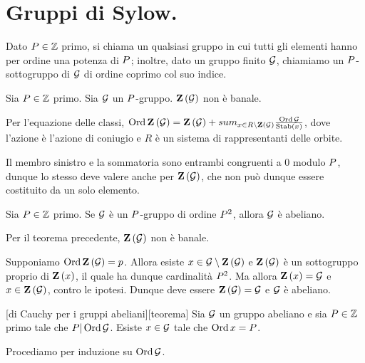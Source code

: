 \section{Gruppi di Sylow.}\label{GruppiDiSylow}
\begin{Definition}
	Dato $P \in \mathbb{Z}$ primo,
	si chiama  un qualsiasi gruppo
	in cui tutti gli elementi hanno per ordine una potenza di $P$;
	inoltre, dato un gruppo finito $\mathcal{G}$,
	chiamiamo 
	un $P$-sottogruppo di $\mathcal{G}$ di ordine
	coprimo col suo indice.
\end{Definition}
\begin{Theorem}
	Sia $P \in \mathbb{Z}$ primo.
	Sia $\mathcal{G}$ un $P$-gruppo.
	$\textbf{Z} \left ( \mathcal{G} \right )$ non \`e banale.
\end{Theorem}
\Proof
Per l'equazione delle classi,
$\GroupOrder{\GroupCenter{\Group}} =
\GroupCenter{\Group} +
sum_{x \in R \SetMin \GroupCenter{\Group}}
\frac{\GroupOrder{\Group}}{\Stabilizer{x}}$,
dove l'azione \`e l'azione di coniugio e
$R$ \`e un sistema di rappresentanti delle orbite.
\par
Il membro sinistro e la sommatoria sono entrambi
congruenti a $0$ modulo $P$, dunque lo stesso
deve valere anche per $\textbf{Z} \left ( \mathcal{G} \right )$, che non
pu\`o dunque essere costituito da un solo elemento.
\EndProof
\begin{Corollary}
	Sia $P \in \mathbb{Z}$ primo.
	Se $\mathcal{G}$ \`e un $P$-gruppo di ordine
	$P^2$, allora $\mathcal{G}$ \`e abeliano.
\end{Corollary}
\Proof
Per il teorema precedente, $\textbf{Z} \left ( \mathcal{G} \right )$
non \`e banale.
\par
Supponiamo $\operatorname{\operatorname{Ord}}{\textbf{Z} \left ( \mathcal{G} \right )} = p$.
Allora esiste $x \in \mathcal{G} \setminus \textbf{Z} \left ( \mathcal{G} \right )$ e
$\textbf{Z} \left ( \mathcal{G} \right )$ \`e un sottogruppo proprio
di $\textbf{Z} \left ( x \right )$, il quale ha dunque cardinalit\`a
$P^2$. Ma allora $\textbf{Z} \left ( x \right ) = \mathcal{G}$ e
$x \in \textbf{Z} \left ( \mathcal{G} \right )$, contro le ipotesi.
Dunque deve essere $\textbf{Z} \left ( \mathcal{G} \right ) = \mathcal{G}$
e $\mathcal{G}$ \`e abeliano.
\EndProof
\begin{Theorem}
[di Cauchy per i gruppi
abeliani][teorema]
	Sia $\mathcal{G}$ un gruppo abeliano e sia
	$P \in \mathbb{Z}$ primo tale che
	$P | \operatorname{\operatorname{Ord}}{\mathcal{G}}$.
	Esiste $x \in \mathcal{G}$ tale che
	$\operatorname{\operatorname{Ord}}{x} = P$.
\end{Theorem}
\Proof
Procediamo per induzione su $\operatorname{\operatorname{Ord}}{\mathcal{G}}$.
\par
